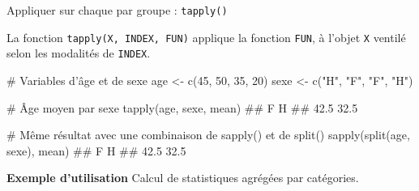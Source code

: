 \documentclass[12pt,ignorenonframetext,handout,]{beamer}
\newenvironment{Shaded}{}{}
\newcommand{\CommentTok}[1]{\textcolor[rgb]{0.00,0.50,0.00}{#1}}
\newcommand{\DecValTok}[1]{#1}
\newcommand{\KeywordTok}[1]{\textcolor[rgb]{0.00,0.00,1.00}{#1}}
\newcommand{\NormalTok}[1]{#1}
\newcommand{\StringTok}[1]{\textcolor[rgb]{0.00,0.50,0.50}{#1}}
\renewenvironment{Shaded}{\begin{snugshade}}{\end{snugshade}}
\newcommand{\intertitre}[1]{\textcolor{redInsee}{\textbf{#1}}}
\begin{document}
\begin{frame}[fragile]{\large Appliquer sur chaque par groupe :
\texttt{tapply()}}
\protect\hypertarget{appliquer-sur-chaque-par-groupe-tapply}{}

La fonction \texttt{tapply(X,\ INDEX,\ FUN)} applique la fonction
\texttt{FUN}, à l’objet \texttt{X} ventilé selon les modalités de
\texttt{INDEX}.

\footnotesize \pause

\begin{Shaded}
\begin{Highlighting}[]
\CommentTok{# Variables d'âge et de sexe}
\NormalTok{age <-}\StringTok{ }\KeywordTok{c}\NormalTok{(}\DecValTok{45}\NormalTok{, }\DecValTok{50}\NormalTok{, }\DecValTok{35}\NormalTok{, }\DecValTok{20}\NormalTok{)}
\NormalTok{sexe <-}\StringTok{ }\KeywordTok{c}\NormalTok{(}\StringTok{"H"}\NormalTok{, }\StringTok{"F"}\NormalTok{, }\StringTok{"F"}\NormalTok{, }\StringTok{"H"}\NormalTok{)}

\CommentTok{# Âge moyen par sexe}
\KeywordTok{tapply}\NormalTok{(age, sexe, mean)}
\NormalTok{  ##    F    H }
\NormalTok{  ## 42.5 32.5}

\CommentTok{# Même résultat avec une combinaison de sapply() et de split()}
\KeywordTok{sapply}\NormalTok{(}\KeywordTok{split}\NormalTok{(age, sexe), mean)}
\NormalTok{  ##    F    H }
\NormalTok{  ## 42.5 32.5}
\end{Highlighting}
\end{Shaded}

\normalsize \pause \vspace{-0.2cm}

\intertitre{Exemple d'utilisation} Calcul de statistiques agrégées par
catégories.

\end{frame}
\end{document}
